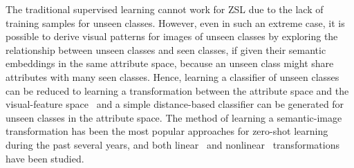 \documentclass[letterpaper]{article} %
\begin{document}
The traditional supervised learning cannot work for ZSL due to the lack of training samples for unseen classes. However, even in such an extreme case, it is possible to derive visual patterns for images of unseen classes by exploring the relationship between unseen classes and seen classes, if given their semantic embeddings in the same attribute space, because an unseen class might share attributes with many seen classes.
Hence, learning a classifier of unseen classes can be reduced to learning a transformation between the attribute space and the visual-feature space~\cite{frome2013devise,xie2019attentive} and a simple distance-based classifier can be generated for unseen classes in the attribute space.
The method of learning a semantic-image transformation has been the most popular approaches for zero-shot learning during the past several years, and both  linear~\cite{frome2013devise} and nonlinear~\cite{socher2013zero,xian2016latent} transformations have been studied.
\end{document}
